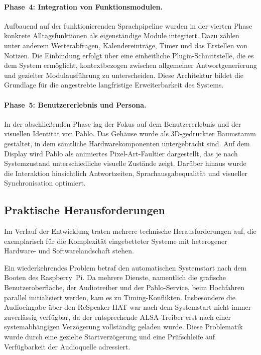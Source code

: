 \paragraph{Phase~4: Integration von Funktionsmodulen.}
Aufbauend auf der funktionierenden Sprachpipeline wurden in der vierten Phase konkrete Alltagsfunktionen als eigenständige Module integriert.
Dazu zählen unter anderem Wetterabfragen, Kalendereinträge, Timer und das Erstellen von Notizen.
Die Einbindung erfolgt über eine einheitliche Plugin-Schnittstelle, die es dem System ermöglicht, kontextbezogen zwischen allgemeiner Antwortgenerierung und gezielter Modulausführung zu unterscheiden.
Diese Architektur bildet die Grundlage für die angestrebte langfristige Erweiterbarkeit des Systems.

\paragraph{Phase~5: Benutzererlebnis und Persona.}
In der abschließenden Phase lag der Fokus auf dem Benutzererlebnis und der visuellen Identität von Pablo.
Das Gehäuse wurde als 3D-gedruckter Baumstamm gestaltet, in dem sämtliche Hardwarekomponenten untergebracht sind.
Auf dem Display wird Pablo als animiertes Pixel-Art-Faultier dargestellt, das je nach Systemzustand unterschiedliche visuelle Zustände zeigt.
Darüber hinaus wurde die Interaktion hinsichtlich Antwortzeiten, Sprachausgabequalität und visueller Synchronisation optimiert.


\subsection{Praktische Herausforderungen}

Im Verlauf der Entwicklung traten mehrere technische Herausforderungen auf, die exemplarisch für die Komplexität eingebetteter Systeme mit heterogener Hardware- und Softwarelandschaft stehen.

Ein wiederkehrendes Problem betraf den automatischen Systemstart nach dem Booten des Raspberry~Pi.
Da mehrere Dienste, namentlich die grafische Benutzeroberfläche, der Audiotreiber und der Pablo-Service, beim Hochfahren parallel initialisiert werden, kam es zu Timing-Konflikten.
Insbesondere die Audioeingabe über den ReSpeaker-HAT war nach dem Systemstart nicht immer zuverlässig verfügbar, da der entsprechende ALSA-Treiber erst nach einer systemabhängigen Verzögerung vollständig geladen wurde.
Diese Problematik wurde durch eine gezielte Startverzögerung und eine Prüfschleife auf Verfügbarkeit der Audioquelle adressiert.


